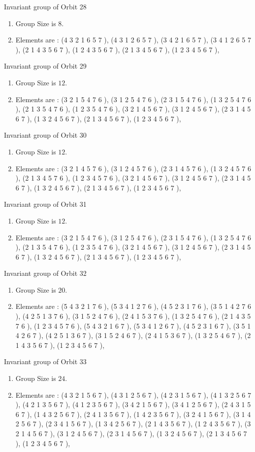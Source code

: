 \documentclass[12pt]{article}
\begin{document}
Invariant group of Orbit 28
\begin{enumerate}
\item Group Size is $8$.
\item Elements are : (4 3 2 1 6 5 7  ), (4 3 1 2 6 5 7  ), (3 4 2 1 6 5 7  ), (3 4 1 2 6 5 7  ), (2 1 4 3 5 6 7  ), (1 2 4 3 5 6 7  ), (2 1 3 4 5 6 7  ), (1 2 3 4 5 6 7  ), 
\end{enumerate}
Invariant group of Orbit 29
\begin{enumerate}
\item Group Size is $12$.
\item Elements are : (3 2 1 5 4 7 6  ), (3 1 2 5 4 7 6  ), (2 3 1 5 4 7 6  ), (1 3 2 5 4 7 6  ), (2 1 3 5 4 7 6  ), (1 2 3 5 4 7 6  ), (3 2 1 4 5 6 7  ), (3 1 2 4 5 6 7  ), (2 3 1 4 5 6 7  ), (1 3 2 4 5 6 7  ), (2 1 3 4 5 6 7  ), (1 2 3 4 5 6 7  ), 
\end{enumerate}
Invariant group of Orbit 30
\begin{enumerate}
\item Group Size is $12$.
\item Elements are : (3 2 1 4 5 7 6  ), (3 1 2 4 5 7 6  ), (2 3 1 4 5 7 6  ), (1 3 2 4 5 7 6  ), (2 1 3 4 5 7 6  ), (1 2 3 4 5 7 6  ), (3 2 1 4 5 6 7  ), (3 1 2 4 5 6 7  ), (2 3 1 4 5 6 7  ), (1 3 2 4 5 6 7  ), (2 1 3 4 5 6 7  ), (1 2 3 4 5 6 7  ), 
\end{enumerate}
Invariant group of Orbit 31
\begin{enumerate}
\item Group Size is $12$.
\item Elements are : (3 2 1 5 4 7 6  ), (3 1 2 5 4 7 6  ), (2 3 1 5 4 7 6  ), (1 3 2 5 4 7 6  ), (2 1 3 5 4 7 6  ), (1 2 3 5 4 7 6  ), (3 2 1 4 5 6 7  ), (3 1 2 4 5 6 7  ), (2 3 1 4 5 6 7  ), (1 3 2 4 5 6 7  ), (2 1 3 4 5 6 7  ), (1 2 3 4 5 6 7  ), 
\end{enumerate}
Invariant group of Orbit 32
\begin{enumerate}
\item Group Size is $20$.
\item Elements are : (5 4 3 2 1 7 6  ), (5 3 4 1 2 7 6  ), (4 5 2 3 1 7 6  ), (3 5 1 4 2 7 6  ), (4 2 5 1 3 7 6  ), (3 1 5 2 4 7 6  ), (2 4 1 5 3 7 6  ), (1 3 2 5 4 7 6  ), (2 1 4 3 5 7 6  ), (1 2 3 4 5 7 6  ), (5 4 3 2 1 6 7  ), (5 3 4 1 2 6 7  ), (4 5 2 3 1 6 7  ), (3 5 1 4 2 6 7  ), (4 2 5 1 3 6 7  ), (3 1 5 2 4 6 7  ), (2 4 1 5 3 6 7  ), (1 3 2 5 4 6 7  ), (2 1 4 3 5 6 7  ), (1 2 3 4 5 6 7  ), 
\end{enumerate}
Invariant group of Orbit 33
\begin{enumerate}
\item Group Size is $24$.
\item Elements are : (4 3 2 1 5 6 7  ), (4 3 1 2 5 6 7  ), (4 2 3 1 5 6 7  ), (4 1 3 2 5 6 7  ), (4 2 1 3 5 6 7  ), (4 1 2 3 5 6 7  ), (3 4 2 1 5 6 7  ), (3 4 1 2 5 6 7  ), (2 4 3 1 5 6 7  ), (1 4 3 2 5 6 7  ), (2 4 1 3 5 6 7  ), (1 4 2 3 5 6 7  ), (3 2 4 1 5 6 7  ), (3 1 4 2 5 6 7  ), (2 3 4 1 5 6 7  ), (1 3 4 2 5 6 7  ), (2 1 4 3 5 6 7  ), (1 2 4 3 5 6 7  ), (3 2 1 4 5 6 7  ), (3 1 2 4 5 6 7  ), (2 3 1 4 5 6 7  ), (1 3 2 4 5 6 7  ), (2 1 3 4 5 6 7  ), (1 2 3 4 5 6 7  ), 
\end{enumerate}
\end{document}
